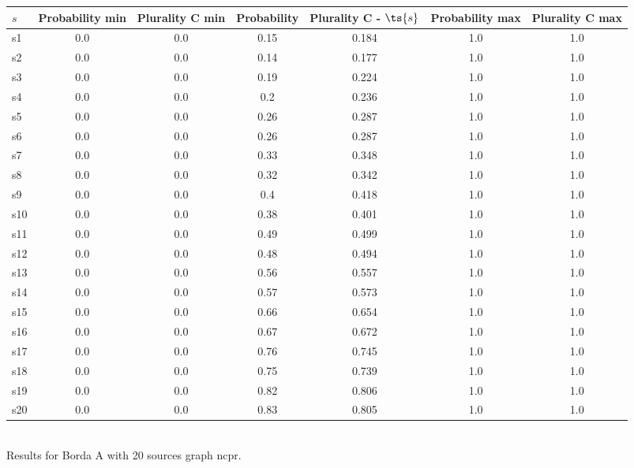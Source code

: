 \documentclass{article}
\begin{document}
\noindent\begin{tabular}{|l|c|c|c|c|c|c|}
\hline
$s$& Probability min & Plurality C min & Probability & Plurality C - $\ts{s}$ & Probability max & Plurality C max\\
\hline
s1 &0.0 & 0.0 & 0.15 & 0.184 & 1.0 & 1.0\\
\hline
s2 &0.0 & 0.0 & 0.14 & 0.177 & 1.0 & 1.0\\
\hline
s3 &0.0 & 0.0 & 0.19 & 0.224 & 1.0 & 1.0\\
\hline
s4 &0.0 & 0.0 & 0.2 & 0.236 & 1.0 & 1.0\\
\hline
s5 &0.0 & 0.0 & 0.26 & 0.287 & 1.0 & 1.0\\
\hline
s6 &0.0 & 0.0 & 0.26 & 0.287 & 1.0 & 1.0\\
\hline
s7 &0.0 & 0.0 & 0.33 & 0.348 & 1.0 & 1.0\\
\hline
s8 &0.0 & 0.0 & 0.32 & 0.342 & 1.0 & 1.0\\
\hline
s9 &0.0 & 0.0 & 0.4 & 0.418 & 1.0 & 1.0\\
\hline
s10 &0.0 & 0.0 & 0.38 & 0.401 & 1.0 & 1.0\\
\hline
s11 &0.0 & 0.0 & 0.49 & 0.499 & 1.0 & 1.0\\
\hline
s12 &0.0 & 0.0 & 0.48 & 0.494 & 1.0 & 1.0\\
\hline
s13 &0.0 & 0.0 & 0.56 & 0.557 & 1.0 & 1.0\\
\hline
s14 &0.0 & 0.0 & 0.57 & 0.573 & 1.0 & 1.0\\
\hline
s15 &0.0 & 0.0 & 0.66 & 0.654 & 1.0 & 1.0\\
\hline
s16 &0.0 & 0.0 & 0.67 & 0.672 & 1.0 & 1.0\\
\hline
s17 &0.0 & 0.0 & 0.76 & 0.745 & 1.0 & 1.0\\
\hline
s18 &0.0 & 0.0 & 0.75 & 0.739 & 1.0 & 1.0\\
\hline
s19 &0.0 & 0.0 & 0.82 & 0.806 & 1.0 & 1.0\\
\hline
s20 &0.0 & 0.0 & 0.83 & 0.805 & 1.0 & 1.0\\
\hline
\end{tabular}\\

\noindent Results for Borda A with 20 sources graph ncpr.
\end{document}
